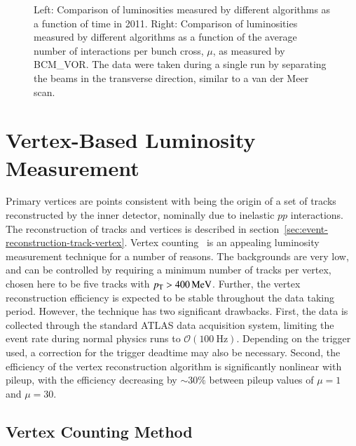 \begin{figure}
{	}
	\hfill
	\caption{Left:  Comparison of luminosities measured by different algorithms as a function of time in 2011. Right:  Comparison of luminosities measured by different algorithms as a function of the average number of interactions per bunch cross, $\mu$, as measured by BCM\_VOR. The data were taken during a single run by separating the beams in the transverse direction, similar to a van der Meer scan.}
	\label{fig:luminosity-comparisons}
\end{figure}


\section{Vertex-Based Luminosity Measurement}\label{sec:luminosity-vertex}

Primary vertices are points consistent with being the origin of a set of tracks reconstructed by the inner detector, nominally due to inelastic $pp$ interactions. The reconstruction of tracks and vertices is described in section~\ref{sec:event-reconstruction-track-vertex}. Vertex counting~\cite{PaganGriso:2013wn} is an appealing luminosity measurement technique for a number of reasons. The backgrounds are very low, and can be controlled by requiring a minimum number of tracks per vertex, chosen here to be five tracks with $p_{\text{T}}>\SI{400}{\mega\electronvolt}$. Further, the vertex reconstruction efficiency is expected to be stable throughout the data taking period. However, the technique has two significant drawbacks. First, the data is collected through the standard ATLAS data acquisition system, limiting the event rate during normal physics runs to $\mathcal{O}(\SI{100}{\hertz})$. Depending on the trigger used, a correction for the trigger deadtime may also be necessary. Second, the efficiency of the vertex reconstruction algorithm is significantly nonlinear with pileup, with the efficiency decreasing by $\sim30\%$ between pileup values of $\mu=1$ and $\mu=30$. 

\subsection{Vertex Counting Method}\label{sec:luminosity-vertex-method}

